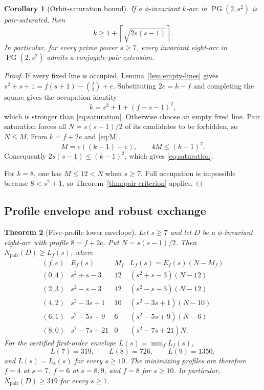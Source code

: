 \documentclass[11pt]{article}
\newtheorem{theorem}{Theorem}[section]
\newtheorem{corollary}[theorem]{Corollary}
\theoremstyle{definition}
\theoremstyle{remark}
\newcommand{\PG}{\operatorname{PG}}
\newcommand{\Npair}{N_{\mathrm{pair}}}
\begin{document}
\begin{corollary}[Orbit-saturation bound]\label{cor:saturation}
If a $\phi$-invariant $k$-arc in $\PG(2,s^2)$ is pair-saturated, then
\begin{equation}\label{eq:saturation}
  k\ge 1+\left\lceil\sqrt{2s(s-1)}\right\rceil.
\end{equation}
In particular, for every prime power $s\ge7$, every invariant eight-arc in
$\PG(2,s^2)$ admits a conjugate-pair extension.
\end{corollary}

\begin{proof}
If every fixed line is occupied, Lemma~\ref{lem:empty-lines} gives
$s^2+s+1=f(s+1)-\binom f2+e$.  Substituting $2e=k-f$ and completing the
square gives the occupation identity
\[
  k=s^2+1+(f-s-1)^2,
\]
which is stronger than \eqref{eq:saturation}.  Otherwise choose an empty
fixed line.  Pair saturation forces all $N=s(s-1)/2$ of its candidates to
be forbidden, so $N\le M$.  From $k=f+2e$ and \eqref{eq:M},
\[
  M=e((k-1)-e),
  \qquad
  4M\le(k-1)^2.
\]
Consequently $2s(s-1)\le(k-1)^2$, which gives
\eqref{eq:saturation}.

For $k=8$, one has $M\le12<N$ when $s\ge7$.  Full occupation is impossible
because $8<s^2+1$, so Theorem~\ref{thm:pair-criterion} applies.
\end{proof}

\subsection*{Profile envelope and robust exchange}

\begin{theorem}[Five-profile lower envelope]\label{thm:profile-envelope}
Let $s\ge7$ and let $D$ be a $\phi$-invariant eight-arc with profile
$8=f+2e$.  Put $N=s(s-1)/2$.  Then $\Npair(D)\ge L_f(s)$, where
\[
\begin{array}{c|c|c|c}
(f,e)&E_f(s)&M_f&L_f(s)=E_f(s)(N-M_f)\\ \hline
(0,4)&s^2+s-3&12&(s^2+s-3)(N-12)\\
(2,3)&s^2-s-3&12&(s^2-s-3)(N-12)\\
(4,2)&s^2-3s+1&10&(s^2-3s+1)(N-10)\\
(6,1)&s^2-5s+9&6&(s^2-5s+9)(N-6)\\
(8,0)&s^2-7s+21&0&(s^2-7s+21)N.
\end{array}
\]
For the certified first-order envelope $L(s)=\min_f L_f(s)$,
\[
  L(7)=319,\qquad L(8)=726,\qquad L(9)=1350,
\]
and $L(s)=L_8(s)$ for every $s\ge10$.  The minimizing profiles are therefore
$f=4$ at $s=7$, $f=6$ at $s=8,9$, and $f=8$ for $s\ge10$.
In particular, $\Npair(D)\ge319$ for every $s\ge7$.
\end{theorem}
\end{document}
